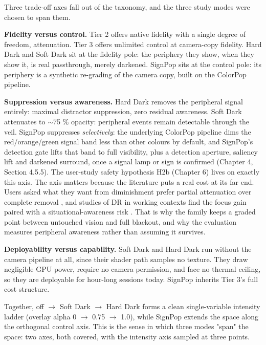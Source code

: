 Three trade-off axes fall out of the taxonomy, and the three study modes were chosen to span them.

\textbf{Fidelity versus control.} Tier 2 offers native fidelity with a single degree of freedom,
attenuation. Tier 3 offers unlimited control at camera-copy fidelity. Hard Dark and Soft Dark sit
at the fidelity pole: the periphery they show, when they show it, is real passthrough, merely
darkened. SignPop sits at the control pole: its periphery is a synthetic re-grading of the camera
copy, built on the ColorPop pipeline.

\textbf{Suppression versus awareness.} Hard Dark removes the peripheral signal entirely: maximal
distractor suppression, zero residual awareness. Soft Dark attenuates to $\sim$75 \% opacity: peripheral
events remain detectable through the veil. SignPop suppresses \textit{selectively}: the underlying ColorPop
pipeline dims the red/orange/green signal band less than other colours by default, and SignPop's
detection gate lifts that band to full visibility, plus a detection aperture, saliency lift and
darkened surround, once a signal lamp or sign is confirmed (Chapter 4, Section 4.5.5). The user-study
safety hypothesis H2b (Chapter 6) lives on exactly this axis. The axis matters because the literature
puts a real cost at its far end. Users asked what they want from diminishment prefer partial
attenuation over complete removal \citep{cheng2022}, and studies of DR in working contexts find
the focus gain paired with a situational-awareness risk \citep{murph2021,mclaughlin2025}. That is why the family keeps a graded point between untouched vision and full blackout, and
why the evaluation measures peripheral awareness rather than assuming it survives.

\textbf{Deployability versus capability.} Soft Dark and Hard Dark run without the camera pipeline at all,
since their shader path samples no texture. They draw negligible GPU power, require no camera
permission, and face no thermal ceiling, so they are deployable for hour-long sessions today. SignPop
inherits Tier 3's full cost structure.

Together, off $\rightarrow$ Soft Dark $\rightarrow$ Hard Dark forms a clean single-variable intensity ladder (overlay alpha
0 $\rightarrow$ 0.75 $\rightarrow$ 1.0), while SignPop extends the space along the orthogonal control axis. This is the
sense in which three modes "span" the space: two axes, both covered, with the intensity axis sampled
at three points.

